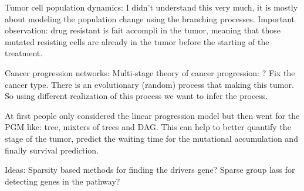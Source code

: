 	Tumor cell population dynamics:
	I didn't understand this very much, it is mostly about modeling the population change using the branching processes. 
	Important observation: drug resistant is fait accompli in the tumor, meaning that those mutated resisting cells are already in the tumor before the starting of the treatment. 
	
	Cancer progression networks:
	Multi-stage theory of cancer progression: ? 
	Fix the cancer type. There is an evolutionary (random) process that making this tumor. 
	So using different realization of this process we want to infer the process. 
	
	At first people only considered the linear progression model but then went for the PGM like: tree, mixters of trees and DAG. 
	This can help to better quantify the stage of the tumor, predict the waiting time for the mutational accumulation and finally survival prediction. 
	
	
	
	Ideas: 
	Sparsity based methods for finding the drivers gene?
	Sparse group lass for detecting genes in the pathway?  
	
	
	
	
	
	
	

	
	